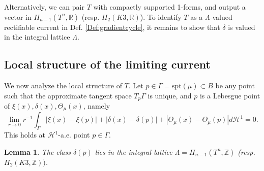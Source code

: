 \documentclass{article}
\newtheorem{lem}[thm]{Lemma}
\theoremstyle{definition}
\newcommand{\R}{\mathbb{R}}
\newcommand{\Z}{\mathbb{Z}}
\begin{document}
		
		
		
		Alternatively, we can pair $T$ with compactly supported 1-forms, and output a vector in $H_{n-1}(T^n,\R)$ (resp. $H_2(K3, \R)$).  To identify $T$ as a $\Lambda$-valued rectifiable current in Def. \ref{Def:gradientcycle}, it remains to show that $\delta$ is valued in the integral lattice $\Lambda$.
		
		
		

		
		
		
		
		
		
		\subsection{Local structure of the limiting current}
		
		
		
		
		
		
		
		
		
		
		
		
		
		We now analyze the local structure of $T$.
		Let $p\in \Gamma= \text{spt}(\mu)  \subset B$ be any point such that the approximate tangent space $T_p \Gamma$ is unique, and $p$ is a Lebesgue point of $\xi(x), \delta(x), \Theta_\mu(x)$, namely
		\[
		\lim_{r\to 0} r^{-1} \int_\Gamma |\xi(x)- \xi(p)|  +  |\delta(x)- \delta(p)|  + |\Theta_\mu(x)-\Theta_\mu(p)|  d\mathcal{H}^1=0.
		\]
		This holds at $\mathcal{H}^1$-a.e. point $p\in \Gamma$. 
		
		
		\begin{lem}\label{lem:integrality}
		The class $\delta(p)$ lies in the integral lattice $\Lambda= H_{n-1}(T^n,\Z)$ (resp. $H_2(K3,\Z))$.
		\end{lem}
		
		
		
\end{document}

